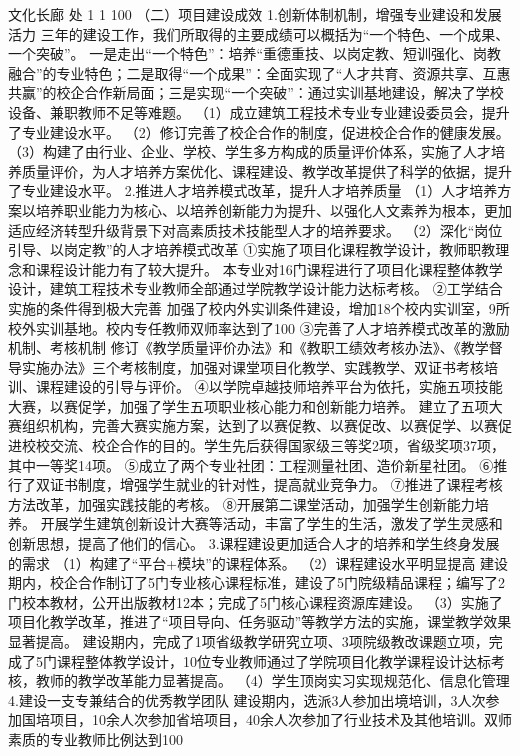 文化长廊
处
1
1
100%
（二）项目建设成效
1.创新体制机制，增强专业建设和发展活力
三年的建设工作，我们所取得的主要成绩可以概括为“一个特色、一个成果、一个突破”。
一是走出“一个特色”：培养“重德重技、以岗定教、短训强化、岗教融合”的专业特色；二是取得“一个成果”：全面实现了“人才共育、资源共享、互惠共赢”的校企合作新局面；三是实现“一个突破”：通过实训基地建设，解决了学校设备、兼职教师不足等难题。
（1）成立建筑工程技术专业专业建设委员会，提升了专业建设水平。
（2）修订完善了校企合作的制度，促进校企合作的健康发展。
（3）构建了由行业、企业、学校、学生多方构成的质量评价体系，实施了人才培养质量评价，为人才培养方案优化、课程建设、教学改革提供了科学的依据，提升了专业建设水平。
2.推进人才培养模式改革，提升人才培养质量
（1）人才培养方案以培养职业能力为核心、以培养创新能力为提升、以强化人文素养为根本，更加适应经济转型升级背景下对高素质技术技能型人才的培养要求。
（2）深化“岗位引导、以岗定教”的人才培养模式改革
①实施了项目化课程教学设计，教师职教理念和课程设计能力有了较大提升。
本专业对16门课程进行了项目化课程整体教学设计，建筑工程技术专业教师全部通过学院教学设计能力达标考核。 
②工学结合实施的条件得到极大完善
加强了校内外实训条件建设，增加18个校内实训室，9所校外实训基地。校内专任教师双师率达到了100%
③完善了人才培养模式改革的激励机制、考核机制
修订《教学质量评价办法》和《教职工绩效考核办法》、《教学督导实施办法》三个考核制度，加强对课堂项目化教学、实践教学、双证书考核培训、课程建设的引导与评价。
④以学院卓越技师培养平台为依托，实施五项技能大赛，以赛促学，加强了学生五项职业核心能力和创新能力培养。
建立了五项大赛组织机构，完善大赛实施方案，达到了以赛促教、以赛促改、以赛促学、以赛促进校校交流、校企合作的目的。学生先后获得国家级三等奖2项，省级奖项37项，其中一等奖14项。
⑤成立了两个专业社团：工程测量社团、造价新星社团。
⑥推行了双证书制度，增强学生就业的针对性，提高就业竞争力。  
⑦推进了课程考核方法改革，加强实践技能的考核。
⑧开展第二课堂活动，加强学生创新能力培养。
开展学生建筑创新设计大赛等活动，丰富了学生的生活，激发了学生灵感和创新思想，提高了他们的信心。
3.课程建设更加适合人才的培养和学生终身发展的需求
（1）构建了“平台+模块”的课程体系。
（2）课程建设水平明显提高
建设期内，校企合作制订了5门专业核心课程标准，建设了5门院级精品课程；编写了2门校本教材，公开出版教材12本；完成了5门核心课程资源库建设。
（3）实施了项目化教学改革，推进了“项目导向、任务驱动”等教学方法的实施，课堂教学效果显著提高。
建设期内，完成了1项省级教学研究立项、3项院级教改课题立项，完成了5门课程整体教学设计，10位专业教师通过了学院项目化教学课程设计达标考核，教师的教学改革能力显著提高。
（4）学生顶岗实习实现规范化、信息化管理
4.建设一支专兼结合的优秀教学团队
建设期内，选派3人参加出境培训，3人次参加国培项目，10余人次参加省培项目，40余人次参加了行业技术及其他培训。双师素质的专业教师比例达到100%
